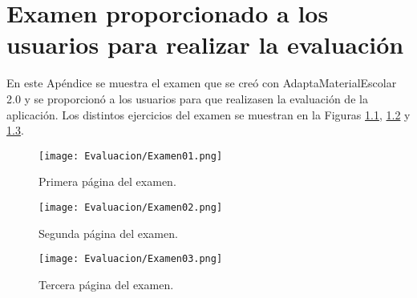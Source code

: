 \chapter{Examen proporcionado a los usuarios para realizar la evaluación}\label{ape:examenEvaluacion}

En este Apéndice se muestra el examen que se creó con AdaptaMaterialEscolar 2.0 y se proporcionó a los usuarios para que realizasen la evaluación de la aplicación. Los distintos ejercicios del examen se muestran en la Figuras \ref{fig:examenEvaluacionA}, \ref{fig:examenEvaluacionB} y \ref{fig:examenEvaluacionC}.

\begin{figure}[H]
    \centering
    \texttt{[image: Evaluacion/Examen01.png]}
    \caption{Primera página del examen.}
    \label{fig:examenEvaluacionA}
\end{figure}

\begin{figure}[H]
    \centering
    \texttt{[image: Evaluacion/Examen02.png]}
    \caption{Segunda página del examen.}
    \label{fig:examenEvaluacionB}
\end{figure}

\begin{figure}[H]
    \centering
    \texttt{[image: Evaluacion/Examen03.png]}
    \caption{Tercera página del examen.}
    \label{fig:examenEvaluacionC}
\end{figure}